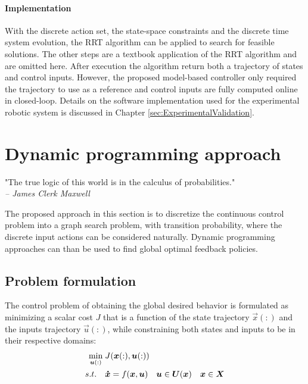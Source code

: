 \paragraph{Implementation}
%
With the discrete action set, the state-space constraints and the discrete time system evolution, the RRT algorithm can be applied to search for feasible solutions. The other steps are a textbook application of the RRT algorithm \cite{lavalle_planning_2006} and are omitted here.  After execution the algorithm return both a trajectory of states and control inputs. However, the proposed model-based controller only required the trajectory to use as a reference and control inputs are fully computed online in closed-loop. Details on the software implementation used for the experimental robotic system is discussed in Chapter \ref{sec:ExperimentalValidation}.



\newpage

\section{Dynamic programming approach}
\label{sec:DynamicProgrammingAproach}

\begin{flushright}
\small"The true logic of this world is in the calculus of probabilities." \\ \emph{-- James Clerk Maxwell}
\end{flushright}

The proposed approach in this section is to discretize the continuous control problem into a graph search problem, with transition probability, where the discrete input actions can be considered naturally. Dynamic programming approaches can than be used to find global optimal feedback policies. 

\subsection{Problem formulation}

The control problem of obtaining the global desired behavior is formulated as minimizing a scalar cost $J$ that is a function of the state trajectory $\vec{x}(:)$ and the inputs trajectory $\vec{u}(:)$, while constraining both states and inputs to be in their respective domains:
\begin{align}
	\operatornamewithlimits{min}\limits_{\vec{u}(:)} \; & J(\vec{x}(:),\vec{u}(:)) \\
	s.t. \quad & \vec{\dot{x}} = f(\vec{x}, \vec{u}) \quad \vec{u} \in \boldsymbol{U}(\vec{x}) \quad \vec{x} \in \boldsymbol{X}
	\label{eq:min}
\end{align}

